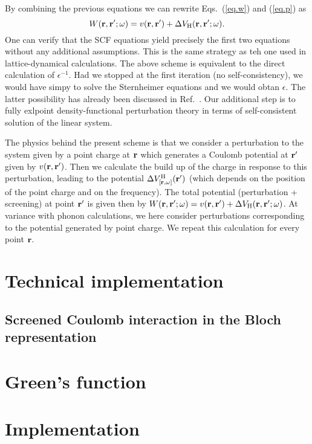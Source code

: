 \documentclass[twocolumn,prb,showpacs,superscriptaddress]{revtex4}
\def\w{\omega}
\def\r{{\bf r}}
\def\rp{{\bf r^\prime}}
\begin{document}
By combining the previous equations we can rewrite Eqs.\ (\ref{eq.w}) and (\ref{eq.p}) as
  \begin{equation}
  W(\r,\rp;\w) = v(\r,\rp) + \Delta V_{\rm H}(\r,\rp;\w).
  \end{equation}
One can verify that the SCF equations yield precisely the first two equations
without any additional assumptions. This is the same strategy as teh one used
in lattice-dynamical calculations.
The above scheme is equivalent to the direct calculation of $\epsilon^{-1}$.
Had we stopped at the first iteration (no self-consistency), we would have
simpy to solve the Sternheimer equations and we would obtan $\epsilon$.
The latter possibility has already been discussed in Ref.\ .
Our additional step is to fully exlpoint density-functional perturbation theory
in terms of self-consistent solution of the linear system.

The physics behind the present scheme is that we consider a perturbation to
the system given by a point charge at $\r$ which generates a Coulomb potential
at $\rp$ given by $v(\r,\rp)$. Then we calculate the build up of the charge
in response to this perturbation, leading to the potential $\Delta V^{\rm H}_{[\r,\w]}(\rp)$
(which depends on the position of the point charge and on the frequency).
The total potential (perturbation + screening) at point $\rp$ is given then
by $W(\r,\rp;\w) = v(\r,\rp) + \Delta V_{\rm H}(\r,\rp;\w)$.
At variance with phonon calculations, we here consider perturbations corresponding
to the potential generated by point charge. We repeat this calculation for
every point $\r$.

\section{Technical implementation}

\subsection{Screened Coulomb interaction in the Bloch representation}



\section{Green's function}

\section{Implementation}
\end{document}
